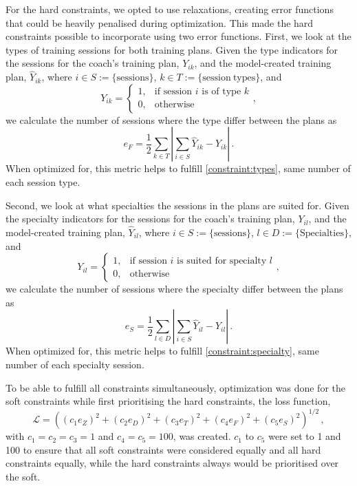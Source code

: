 For the hard constraints, we opted to use relaxations, creating error functions that could be heavily penalised during optimization.
This made the hard constraints possible to incorporate using two error functions.
First, we look at the types of training sessions for both training plans.
Given the type indicators for the sessions for the coach's training plan, $Y_{ik}$, and the model-created training plan, $\hat{Y}_{ik}$, where $i \in S := \{\mathrm{sessions}\}$, $k \in T := \{\mathrm{session\ types}\}$, and 
\begin{equation*}
    Y_{ik} = \begin{cases}
    1, & \text{if session $i$ is of type $k$}   \\
    0, & \text{otherwise}
    \end{cases},
\end{equation*} 
we calculate the number of sessions where the type differ between the plans as
\begin{equation}
    e_{F} = \frac{1}{2}\sum_{k \in T}\left|\sum_{i \in S}\hat{Y}_{ik}-Y_{ik}\right| \,.
\end{equation}
When optimized for, this metric helps to fulfill \cref{constraint:types}, same number of each session type. 

Second, we look at what specialties the sessions in the plans are suited for.
Given the specialty indicators for the sessions for the coach's training plan, $Y_{il}$, and the model-created training plan, $\hat{Y}_{il}$, where $i \in S := \{\mathrm{sessions}\}$, $l \in D := \{\mathrm{Specialties}\}$, and 
\begin{equation*}
    Y_{il} = \begin{cases}
    1, & \text{if session $i$ is suited for specialty $l$}   \\
    0, & \text{otherwise}
    \end{cases},
\end{equation*} 
we calculate the number of sessions where the specialty differ between the plans as
\begin{equation}
    e_{S} = \frac{1}{2}\sum_{l \in D}\left|\sum_{i \in S}\hat{Y}_{il}-Y_{il}\right| \,.
\end{equation}
When optimized for, this metric helps to fulfill \cref{constraint:specialty}, same number of each specialty session. 

To be able to fulfill all constraints simultaneously, optimization was done for the soft constraints while first prioritising the hard constraints, the loss function,
\begin{equation}
    \mathcal{L} = \left(\left( c_1 e_{Z}\right)^2 + \left( c_2 e_{D}\right)^2 + \left( c_3 e_{T}\right)^2 + \left( c_4 e_{F}\right)^2 + \left( c_5 e_{S}\right)^2\right)^{1/2} \,,
    \label{eq:loss_func}
\end{equation}
with $c_1=c_2=c_3=1$ and $c_4=c_5=100$, was created.
$c_1$ to $c_5$ were set to \num{1} and \num{100} to ensure that all soft constraints were considered equally and all hard constraints equally, while the hard constraints always would be prioritised over the soft.


